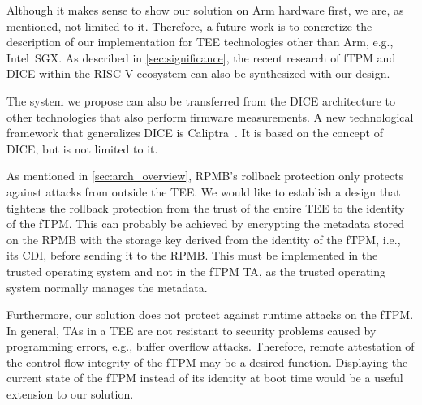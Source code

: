 Although it makes sense to show our solution on Arm hardware first, we are, as mentioned, not limited to it.
Therefore, a future work is to concretize the description of our implementation for TEE technologies other than Arm, e.g., Intel~SGX\@.
As described in \autoref{sec:significance}, the recent research of \ac{fTPM} and \ac{DICE} within the RISC-V ecosystem can also be synthesized with our design.

The system we propose can also be transferred from the \ac{DICE} architecture to other technologies that also perform firmware measurements.
A new technological framework that generalizes \ac{DICE} is Caliptra~\cite{caliptra}.
It is based on the concept of \ac{DICE}, but is not limited to it.

As mentioned in \autoref{sec:arch_overview}, RPMB's rollback protection only protects against attacks from outside the TEE\@.
We would like to establish a design that tightens the rollback protection from the trust of the entire TEE to the identity of the fTPM\@.
This can probably be achieved by encrypting the metadata stored on the RPMB with the storage key derived from the identity of the fTPM, i.e., its CDI, before sending it to the RPMB\@.
This must be implemented in the trusted operating system and not in the fTPM TA, as the trusted operating system normally manages the metadata.

Furthermore, our solution does not protect against runtime attacks on the fTPM\@.
In general, \acp{TA} in a \ac{TEE} are not resistant to security problems caused by programming errors, e.g., buffer overflow attacks.
Therefore, remote attestation of the control flow integrity of the fTPM may be a desired function.
Displaying the current state of the fTPM instead of its identity at boot time would be a useful extension to our solution.

